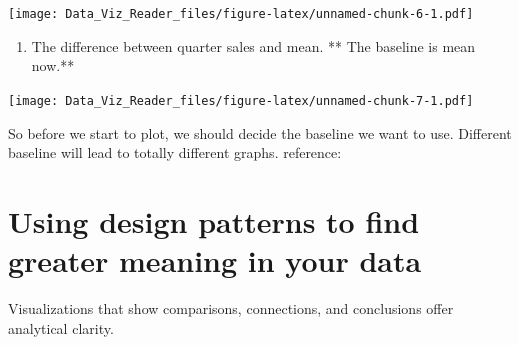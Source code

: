\documentclass[]{book}
\newenvironment{Shaded}{\begin{snugshade}}{\end{snugshade}}
\newcommand{\KeywordTok}[1]{\textcolor[rgb]{0.13,0.29,0.53}{\textbf{#1}}}
\newcommand{\DataTypeTok}[1]{\textcolor[rgb]{0.13,0.29,0.53}{#1}}
\newcommand{\DecValTok}[1]{\textcolor[rgb]{0.00,0.00,0.81}{#1}}
\newcommand{\StringTok}[1]{\textcolor[rgb]{0.31,0.60,0.02}{#1}}
\newcommand{\CommentTok}[1]{\textcolor[rgb]{0.56,0.35,0.01}{\textit{#1}}}
\newcommand{\OtherTok}[1]{\textcolor[rgb]{0.56,0.35,0.01}{#1}}
\newcommand{\ControlFlowTok}[1]{\textcolor[rgb]{0.13,0.29,0.53}{\textbf{#1}}}
\newcommand{\OperatorTok}[1]{\textcolor[rgb]{0.81,0.36,0.00}{\textbf{#1}}}
\newcommand{\NormalTok}[1]{#1}
\providecommand{\tightlist}{%
  \setlength{\itemsep}{0pt}\setlength{\parskip}{0pt}}
\theoremstyle{definition}
\theoremstyle{definition}
\theoremstyle{definition}
\theoremstyle{remark}
\begin{document}
\texttt{[image: Data\_Viz\_Reader\_files/figure-latex/unnamed-chunk-6-1.pdf]}

\begin{enumerate}
\def\labelenumi{\arabic{enumi}.}
\setcounter{enumi}{4}
\tightlist
\item
  The difference between quarter sales and mean. ** The baseline is mean
  now.**
\end{enumerate}

\begin{Shaded}
\end{Shaded}

\texttt{[image: Data\_Viz\_Reader\_files/figure-latex/unnamed-chunk-7-1.pdf]}

So before we start to plot, we should decide the baseline we want to
use. Different baseline will lead to totally different graphs.
reference: \citep{Baseline_2013}

\section{Using design patterns to find greater meaning in your
data}\label{using-design-patterns-to-find-greater-meaning-in-your-data}

Visualizations that show comparisons, connections, and conclusions offer
analytical clarity.
\end{document}
